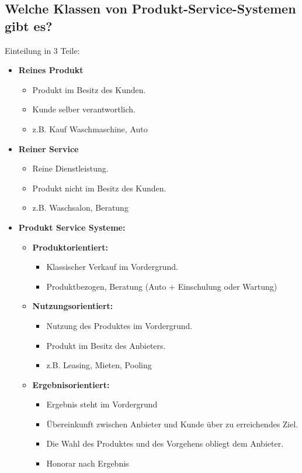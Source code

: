 \subsection{Welche Klassen von Produkt-Service-Systemen gibt es?}
Einteilung in 3 Teile:
\begin{itemize}
    \item \textbf{Reines Produkt}
        \begin{itemize}
            \item Produkt im Besitz des Kunden.
            \item Kunde selber verantwortlich.
            \item z.B. Kauf Waschmaschine, Auto
        \end{itemize}
    \item \textbf{Reiner Service}
        \begin{itemize}
            \item Reine Dienstleistung.
            \item Produkt nicht im Besitz des Kunden.
            \item z.B. Waschsalon, Beratung
        \end{itemize}

    \item \textbf{Produkt Service Systeme:}
    
    \begin{itemize}
    	\item \textbf{Produktorientiert:}
    	\begin{itemize}
    		\item Klassischer Verkauf im Vordergrund.
    		\item Produktbezogen, Beratung (Auto + Einschulung oder Wartung)
    	\end{itemize}
    	
    	\item \textbf{Nutzungsorientiert:}
    	\begin{itemize}
    		\item Nutzung des Produktes im Vordergrund.
    		\item Produkt im Besitz des Anbieters.
    		\item z.B. Leasing, Mieten, Pooling
    	\end{itemize}
    	
    	\item \textbf{Ergebnisorientiert:}
        \begin{itemize}
        	\item Ergebnis steht im Vordergrund
			\item Übereinkunft zwischen Anbieter und Kunde über zu erreichendes Ziel.
			\item Die Wahl des Produktes und des Vorgehens obliegt dem Anbieter.
			\item Honorar nach Ergebnis
		\end{itemize}
    	
    \end{itemize}
        
\end{itemize}


